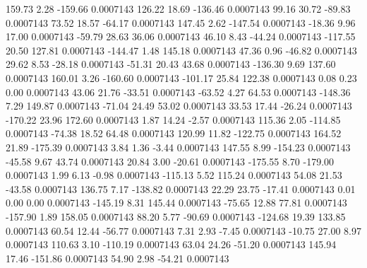       159.73        2.28     -159.66     0.0007143
      126.22       18.69     -136.46     0.0007143
       99.16       30.72      -89.83     0.0007143
       73.52       18.57      -64.17     0.0007143
      147.45        2.62     -147.54     0.0007143
      -18.36        9.96       17.00     0.0007143
      -59.79       28.63       36.06     0.0007143
       46.10        8.43      -44.24     0.0007143
     -117.55       20.50      127.81     0.0007143
     -144.47        1.48      145.18     0.0007143
       47.36        0.96      -46.82     0.0007143
       29.62        8.53      -28.18     0.0007143
      -51.31       20.43       43.68     0.0007143
     -136.30        9.69      137.60     0.0007143
      160.01        3.26     -160.60     0.0007143
     -101.17       25.84      122.38     0.0007143
        0.08        0.23        0.00     0.0007143
       43.06       21.76      -33.51     0.0007143
      -63.52        4.27       64.53     0.0007143
     -148.36        7.29      149.87     0.0007143
      -71.04       24.49       53.02     0.0007143
       33.53       17.44      -26.24     0.0007143
     -170.22       23.96      172.60     0.0007143
        1.87       14.24       -2.57     0.0007143
      115.36        2.05     -114.85     0.0007143
      -74.38       18.52       64.48     0.0007143
      120.99       11.82     -122.75     0.0007143
      164.52       21.89     -175.39     0.0007143
        3.84        1.36       -3.44     0.0007143
      147.55        8.99     -154.23     0.0007143
      -45.58        9.67       43.74     0.0007143
       20.84        3.00      -20.61     0.0007143
     -175.55        8.70     -179.00     0.0007143
        1.99        6.13       -0.98     0.0007143
     -115.13        5.52      115.24     0.0007143
       54.08       21.53      -43.58     0.0007143
      136.75        7.17     -138.82     0.0007143
       22.29       23.75      -17.41     0.0007143
        0.01        0.00        0.00     0.0007143
     -145.19        8.31      145.44     0.0007143
      -75.65       12.88       77.81     0.0007143
     -157.90        1.89      158.05     0.0007143
       88.20        5.77      -90.69     0.0007143
     -124.68       19.39      133.85     0.0007143
       60.54       12.44      -56.77     0.0007143
        7.31        2.93       -7.45     0.0007143
      -10.75       27.00        8.97     0.0007143
      110.63        3.10     -110.19     0.0007143
       63.04       24.26      -51.20     0.0007143
      145.94       17.46     -151.86     0.0007143
       54.90        2.98      -54.21     0.0007143

